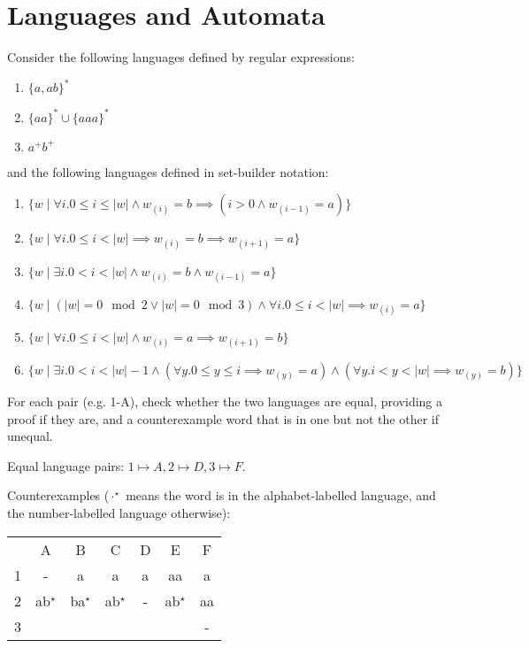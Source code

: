
\section{Languages and Automata}

\begin{exercise}{}

  Consider the following languages defined by regular expressions:
  
  \begin{enumerate}
    \item \(\{a,ab\}^*\)
    \item \(\{aa\}^* \cup \{aaa\}^*\)
    \item \(a^+b^+\)
  \end{enumerate}

  and the following languages defined in set-builder notation:

  \begin{enumerate}
    \renewcommand{\theenumi}{\Alph{enumi}}
    \item \(\{w \mid \forall i. 0 \le i \le |w| \land w_{(i)} = b \implies (i > 0 \land w_{(i - 1)} = a)\}\) %
    \item \(\{w \mid \forall i. 0 \le i < |w| \implies w_{(i)} = b \implies w_{(i + 1)} = a\}\) %
    \item \(\{w \mid \exists i. 0 < i < |w| \land w_{(i)} = b \land w_{(i - 1)} = a\}\) %
    \item \(\{w \mid (|w| = 0 \mod 2 \lor |w| = 0 \mod 3) \land \forall i. 0 \leq i < |w| \implies w_{(i)} = a\}\) %
    \item \(\{w \mid \forall i. 0 \le i < |w| \land w_{(i)} = a \implies w_{(i + 1)} = b\}\) %
    \item \(\{w \mid \exists i. 0 < i < |w| - 1 \land 
    (\forall y. 0 \leq y \leq i \implies w_{(y)} = a) \land  (\forall y. i < y < |w| \implies w_{(y)} = b) \}\) %
  \end{enumerate}

  For each pair (e.g. 1-A), check whether the two languages are equal, providing
  a proof if they are, and a counterexample word that is in one but not the
  other if unequal.

  \begin{solution}

    Equal language pairs: \(1 \mapsto A, 2 \mapsto D, 3 \mapsto F\).

    Counterexamples (\(\cdot^\star\) means the word is in the alphabet-labelled
    language, and the number-labelled language otherwise):
    \begin{center}
      \begin{tabular}{c c c c c c c}
        & A & B & C & D & E & F \\
        1 & - & a & a & a & aa & a \\
        2 & ab\(^\star\) & ba\(^\star\)& ab\(^\star\)& - & ab\(^\star\)& aa \\
        3 & & & & & & - \\
      \end{tabular}
    \end{center}


\end{solution}
\end{exercise}
